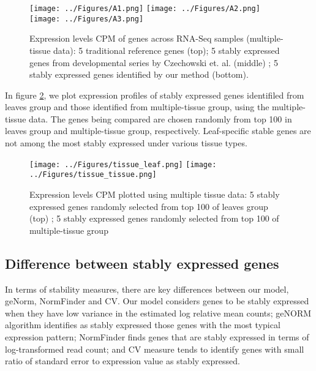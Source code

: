 \documentclass[11pt, a4paper]{article}
\begin{document}
 \begin{figure}[H]
\begin{center}
	\texttt{[image: ../Figures/A1.png]}
	\texttt{[image: ../Figures/A2.png]}
	\texttt{[image: ../Figures/A3.png]}
	\caption{{\small{\label{expressinlevel1} Expression levels CPM of genes across RNA-Seq samples (multiple-tissue data):  5 traditional reference genes (top)};  5 stably expressed genes from developmental series by Czechowski et. al. (middle) ; 5 stably expressed genes identified by our method (bottom).  }}
\end{center}
\end{figure} 

In figure \ref{expressinlevel2}, we plot expression profiles of stably expressed genes identifiled from leaves group and those identified from multiple-tissue group, using the multiple-tissue data. The genes being compared are chosen randomly from top 100 in leaves group and multiple-tissue group, respectively. Leaf-specific stable genes are not among the most stably expressed under various tissue types. 

 \begin{figure}[H]
 \begin{center}
	\texttt{[image: ../Figures/tissue\_leaf.png]}
	\texttt{[image: ../Figures/tissue\_tissue.png]}
	\caption{{\small{\label{expressinlevel2} Expression levels CPM plotted using multiple tissue data: 5 stably expressed genes randomly selected from top 100 of leaves group (top) ; 5 stably expressed genes randomly selected from top 100 of multiple-tissue group }}}
\end{center}
\end{figure} 

\subsection{Difference between stably expressed genes}\label{section:stabilityMeasure}
 
 In terms of stability measures, there are key differences between our model, geNorm, NormFinder and CV. Our model considers genes to be stably expressed when they have low variance in the estimated log relative mean counts; geNORM algorithm identifies as stably expressed those genes with the most typical expression pattern; NormFinder finds genes that are stably expressed in terms of log-transformed read count; and CV measure tends to identify genes with small ratio of standard error to expression value as stably expressed.
 
\end{document}
